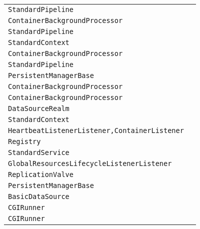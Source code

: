 \begin{center}
\begin{tabular}{ll}
\lstinline/StandardPipeline/&\raisebox{0pt}{\lstinline/ removeValve(Valvevalve)/}\\ 
\lstinline/ContainerBackgroundProcessor/&\raisebox{0pt}{\lstinline/ processChildren(Container)/}\\ 
\lstinline/StandardPipeline/&\raisebox{0pt}{\lstinline/ removeValve(Valvevalve)/}\\ 
\lstinline/StandardContext/&\raisebox{0pt}{\lstinline/ checkUnusualURLPattern(String)/}\\ 
\lstinline/ContainerBackgroundProcessor/&\raisebox{0pt}{\lstinline/ processChildren(Container)/}\\ 
\lstinline/StandardPipeline/&\raisebox{0pt}{\lstinline/ removeValve(Valvevalve)/}\\ 
\lstinline/PersistentManagerBase/&\raisebox{0pt}{\lstinline/ startInternal())/}\\ 
\lstinline/ContainerBackgroundProcessor/&\raisebox{0pt}{\lstinline/ processChildren(Container)/}\\ 
\lstinline/ContainerBackgroundProcessor/&\raisebox{0pt}{\lstinline/ processChildren(Container)/}\\ 
\lstinline/DataSourceRealm/&\raisebox{0pt}{\lstinline/ getRoles(ConnectiondbConnection,String)/}\\ 
\lstinline/StandardContext/&\raisebox{0pt}{\lstinline/ checkUnusualURLPattern(String)/}\\ 
\lstinline/HeartbeatListenerListener,ContainerListener/&\raisebox{0pt}{\lstinline/ lifecycleEvent(LifecycleEvent)/}\\ 
\lstinline/Registry/&\raisebox{0pt}{\lstinline/ loadDescriptors(StringpackageName,ClassLoaderclassLoader)/}\\ 
\lstinline/StandardService/&\raisebox{0pt}{\lstinline/ stopInternal())/}\\ 
\lstinline/GlobalResourcesLifecycleListenerListener/&\raisebox{0pt}{\lstinline/ createMBeans(String,Context))/}\\ 
\lstinline/ReplicationValve/&\raisebox{0pt}{\lstinline/ updateStats(long,long/}\\ 
\lstinline/PersistentManagerBase/&\raisebox{0pt}{\lstinline/ startInternal())/}\\ 
\lstinline/BasicDataSource/&\raisebox{0pt}{\lstinline/ NamepreRegister(MBeanServer,ObjectName)/}\\ 
\lstinline/CGIRunner/&\raisebox{0pt}{\lstinline/ sendToLog(BufferedReaderrdr)/}\\ 
\lstinline/CGIRunner/&\raisebox{0pt}{\lstinline/ sendToLog(BufferedReaderrdr)/}\\ 

\end{tabular}
\end{center}
